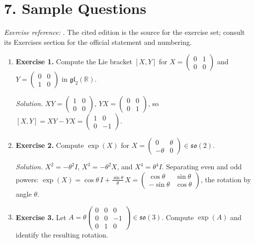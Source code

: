 \section*{7. Sample Questions}
\emph{Exercise reference:} \cite{lie_theory_ref1}. The cited edition is the source for the exercise set; consult its Exercises section for the official statement and numbering.
\begin{enumerate}[leftmargin=*,itemsep=0.9em]
\item \textbf{Exercise 1.} Compute the Lie bracket $[X,Y]$ for $X=\begin{pmatrix}0&1\\0&0\end{pmatrix}$ and $Y=\begin{pmatrix}0&0\\1&0\end{pmatrix}$ in $\mathfrak{gl}_2(\mathbb{R})$.

\emph{Solution.} $XY=\begin{pmatrix}1&0\\0&0\end{pmatrix}$, $YX=\begin{pmatrix}0&0\\0&1\end{pmatrix}$, so $[X,Y]=XY-YX=\begin{pmatrix}1&0\\0&-1\end{pmatrix}$.

\item \textbf{Exercise 2.} Compute $\exp(X)$ for $X=\begin{pmatrix}0&\theta\\-\theta&0\end{pmatrix}\in\mathfrak{so}(2)$.

\emph{Solution.} $X^2=-\theta^2 I$, $X^3=-\theta^2 X$, and $X^4=\theta^4 I$. Separating even and odd powers: $\exp(X)=\cos\theta\, I+\frac{\sin\theta}{\theta}\,X=\begin{pmatrix}\cos\theta&\sin\theta\\-\sin\theta&\cos\theta\end{pmatrix}$, the rotation by angle $\theta$.

\item \textbf{Exercise 3.} Let $A=\theta\begin{pmatrix}0&0&0\\0&0&-1\\0&1&0\end{pmatrix}\in\mathfrak{so}(3)$. Compute $\exp(A)$ and identify the resulting rotation.


\end{enumerate}

